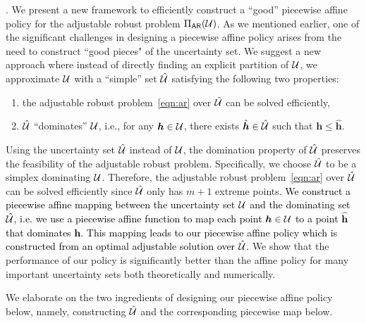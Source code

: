 \documentclass[11pt]{article}
\theoremstyle{plain}
\theoremstyle{definition}
\numberwithin{equation}{section}%
\numberwithin{equation}{section}%
\newcommand{\mb}[1]{\ensuremath{\boldsymbol{#1}}}
\newcommand*{\red}{\textcolor{black}}
\begin{document}
\vspace{2mm}
. We present a new framework to efficiently construct a ``good'' piecewise affine policy for the adjustable robust problem $\Pi_{\sf AR}({\cal U})$. As we mentioned earlier, one of the significant challenges in designing a piecewise affine policy arises from the need to construct ``good pieces" of the uncertainty set. We suggest a new approach where instead of  directly finding an explicit partition of $\cal U$, we approximate $\cal U$ with a ``simple'' set $\hat{\cal U}$ satisfying the following two properties:
\begin{enumerate}
\item  the adjustable robust problem~\eqref{eqn:ar} over $\hat {\cal U}$ can be solved efficiently,
\item $\hat{\cal U}$ ``dominates'' ${\cal U}$,  i.e.,  for any $\mb{h}\in{\cal U}$, there exists $\hat{\mb{h}}\in\hat{\cal U}$ such that $\mb{h}\leq\hat{\mb{h}}$.
\end{enumerate}
Using the uncertainty set $\hat{\cal U}$ instead of ${\cal U}$,
the domination property of $\hat{\cal U}$ preserves the feasibility of the
adjustable robust problem. Specifically, we choose $\hat{\cal U}$ to be a simplex dominating ${\cal U}$. Therefore, the adjustable robust problem~\eqref{eqn:ar} over $\hat{\cal U}$ can be solved efficiently since $\hat{\cal U}$ only has $m+1$ extreme points. \red{We construct a piecewise affine mapping between the uncertainty set ${\cal U}$ and the dominating set $\hat{\cal U}$, i.e. we use a piecewise affine function to map each point $\mb h \in {\cal U}$ to a point $\hat{\mb h}$ that dominates $\mb h$. This mapping leads to
our piecewise affine policy which is constructed from an optimal adjustable solution over $\hat{\cal U}$.} We show that the performance of our policy is significantly better than the affine policy for many important uncertainty sets both theoretically and numerically.

We elaborate on the two ingredients of designing our piecewise affine policy below, namely, constructing $\hat{\cal U}$ and the corresponding piecewise map below.
\end{document}

